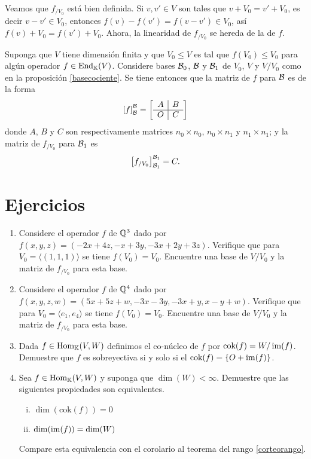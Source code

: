 \dem Veamos que $f_{/V_0}$ está bien definida. Si $v,v'\in V$ son tales que $v+V_0=v'+V_0$, es decir $v-v'\in V_0$, entonces $f(v)-f(v')=f(v-v')\in V_0$, así $f(v)+V_0=f(v')+V_0$. Ahora, la linearidad de $f_{/V_0}$ se hereda de la de $f$.

\begin{obs}\label{matrizcociente}
  Suponga que $V$ tiene dimensión finita y que $V_0\le V$ es tal que $f(V_0)\le V_0$ para algún operador $f\in\operatorname{End}_{\mathbb{K}}(V)$. Considere bases $\mathcal{B}_0$, $\mathcal{B}$ y $\mathcal{B}_1$ de $V_0$, $V$ y $V/V_0$ como en la proposición \ref{basecociente}. Se tiene entonces que la matriz de $f$ para $\mathcal{B}$ es de la forma
  $$
    \left[f\right]_{\mathcal{B}}^{\mathcal{B}}=\left[\begin{array}{c|c}
      A & B\\
      \hline
      O & C
    \end{array}\right]
  $$
donde $A$, $B$ y $C$ son respectivamente matrices $n_0\times n_0$, $n_0\times n_1$ y $n_1\times n_1$; y la matriz de $f_{/V_0}$ para $\mathcal{B}_1$ es
  $$
    \left[f_{/V_0}\right]_{\mathcal{B}_1}^{\mathcal{B}_1}=C.
  $$
\end{obs}

\section*{Ejercicios}
\begin{enumerate}
  \item Considere el operador $f$ de $\mathbb{Q}^3$ dado por $f(x,y,z)=(-2x+4z,-x+3y,-3x+2y+3z)$. Verifique que para  $V_0=\langle (1,1,1)\rangle$ se tiene $f(V_0)=V_0$. Encuentre una base de $V/V_0$ y la matriz de $f_{/V_0}$ para esta base.
  \item Considere el operador $f$ de $\mathbb{Q}^4$ dado por $f(x,y,z,w)=(5x+5z+w,-3x-3y,-3x+y,x-y+w)$. Verifique que para  $V_0=\langle e_1,e_4 \rangle$ se tiene $f(V_0)=V_0$. Encuentre una base de $V/V_0$ y la matriz de $f_{/V_0}$ para esta base.
  \item Dada $f\in\operatorname{Hom}_\mathbb{K}(V,W)$ definimos el co-núcleo de $f$ por $\text{cok}(f)=W/\operatorname{im}(f)$. Demuestre que $f$ es sobreyectiva si y solo si el $\text{cok}(f)=\{O+\operatorname{im}(f)\}$.
  \item Sea $f\in\operatorname{Hom}_\mathbb{K}(V,W)$ y suponga que $\dim(W)<\infty$. Demuestre que las siguientes propiedades son equivalentes.
    \begin{enumerate}[(i)]
      \item $\dim(\text{cok}(f))=0$
      \item $\dim(\operatorname{im}(f))=\dim(W)$
    \end{enumerate}
  Compare esta equivalencia con el corolario al teorema del rango \ref{corteorango}.
\end{enumerate}